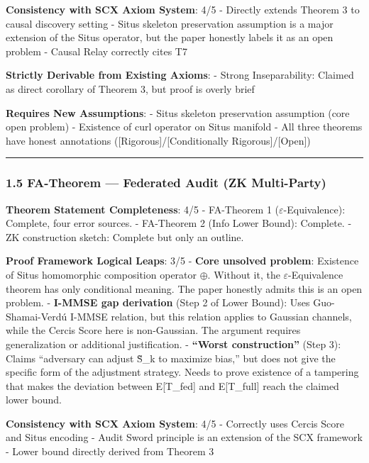 \documentclass[
  12pt,
]{article}
\begin{document}
\textbf{Consistency with SCX Axiom System}: 4/5
- Directly extends Theorem 3 to causal discovery setting
- Situs skeleton preservation assumption is a major extension of the Situs operator, but the paper honestly labels it as an open problem
- Causal Relay correctly cites T7

\textbf{Strictly Derivable from Existing Axioms}:
- Strong Inseparability: Claimed as direct corollary of Theorem 3, but proof is overly brief

\textbf{Requires New Assumptions}:
- Situs skeleton preservation assumption (core open problem)
- Existence of curl operator on Situs manifold
- All three theorems have honest annotations ([Rigorous]/[Conditionally Rigorous]/[Open])

\begin{center}\rule{0.5\linewidth}{0.5pt}\end{center}

\subsubsection{1.5 FA-Theorem --- Federated Audit (ZK Multi-Party)}\label{fa-theorem}

\textbf{Theorem Statement Completeness}: 4/5
- FA-Theorem 1 ($\varepsilon$-Equivalence): Complete, four error sources.
- FA-Theorem 2 (Info Lower Bound): Complete.
- ZK construction sketch: Complete but only an outline.

\textbf{Proof Framework Logical Leaps}: 3/5
- \textbf{Core unsolved problem}: Existence of Situs homomorphic composition operator $\oplus$. Without it, the $\varepsilon$-Equivalence theorem has only conditional meaning. The paper honestly admits this is an open problem.
- \textbf{I-MMSE gap derivation} (Step 2 of Lower Bound): Uses Guo-Shamai-Verd\'{u} I-MMSE relation, but this relation applies to Gaussian channels, while the Cercis Score here is non-Gaussian. The argument requires generalization or additional justification.
- \textbf{``Worst construction''} (Step 3): Claims ``adversary can adjust \~{S}\_k to maximize bias,'' but does not give the specific form of the adjustment strategy. Needs to prove existence of a tampering that makes the deviation between E[T\_fed] and E[T\_full] reach the claimed lower bound.

\textbf{Consistency with SCX Axiom System}: 4/5
- Correctly uses Cercis Score and Situs encoding
- Audit Sword principle is an extension of the SCX framework
- Lower bound directly derived from Theorem 3
\end{document}
